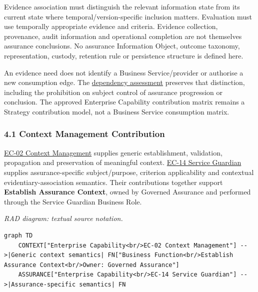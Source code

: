 \label{rad:assurance:134}

Evidence association must distinguish the relevant information state from its current state where temporal/\allowbreak{}version-specific inclusion matters. Evaluation must use temporally appropriate evidence and criteria. Evidence collection, provenance, audit information and operational completion are not themselves assurance conclusions. No assurance Information Object, outcome taxonomy, representation, custody, retention rule or persistence structure is defined here.

\label{rad:assurance:136}

An evidence need does not identify a Business Service/\allowbreak{}provider or authorise a new consumption edge. The \hyperref[rad:dependencies:93]{dependency assessment} preserves that distinction, including the prohibition on subject control of assurance progression or conclusion. The approved Enterprise Capability contribution matrix remains a Strategy contribution model, not a Business Service consumption matrix.

\label{rad:assurance:138}
\subsubsection*{4.1 Context Management Contribution}
\label{rad:assurance:140}

\hyperref[rad:enterprise:112]{EC-02 Context Management} supplies generic establishment, validation, propagation and preservation of meaningful context. \hyperref[rad:enterprise:224]{EC-14 Service Guardian} supplies assurance-specific subject/\allowbreak{}purpose, criterion applicability and contextual evidentiary-association semantics. Their contributions together support \textbf{Establish Assurance Context}, owned by Governed Assurance and performed through the Service Guardian Business Role.

\label{rad:assurance:142}

\textit{RAD diagram: textual source notation.}
\begin{Verbatim}[breaklines,fontsize=\footnotesize]
graph TD
    CONTEXT["Enterprise Capability<br/>EC-02 Context Management"] -->|Generic context semantics| FN["Business Function<br/>Establish Assurance Context<br/>Owner: Governed Assurance"]
    ASSURANCE["Enterprise Capability<br/>EC-14 Service Guardian"] -->|Assurance-specific semantics| FN
\end{Verbatim}
\label{rad:assurance:148}

